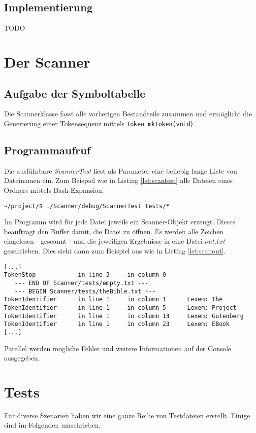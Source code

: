 \documentclass[
a4paper,   %
11pt,      %
oneside,   %
onecolumn, %
final      %
]{article}
\newcommand{\code}[1]{\lstinline$#1$}
\begin{document}
\subsection{Implementierung}
TODO


\section{Der Scanner}

\subsection{Aufgabe der Symboltabelle}
Die Scannerklasse fasst alle vorherigen Bestandteile zusammen und ermöglicht die Generierung einer Tokensequenz mittels \code{Token mkToken(void)}.


\subsection{Programmaufruf}
Die ausführbare \emph{ScannerTest} liest als Parameter eine beliebig lange Liste von Dateinamen ein. Zum Beispiel wie in Listing \ref{lst:scantest} alle Dateien eines Ordners mittels Bash-Expansion.
\begin{lstlisting}[language=PseudoCode, caption={Aufruf von ScannerTest}, label=lst:scantest]
~/project/$ ./Scanner/debug/ScannerTest tests/*
\end{lstlisting}
Im Programm wird für jede Datei jeweils ein Scanner-Objekt erzeugt. Dieses beauftragt den Buffer damit, die Datei zu öffnen. Es werden alle Zeichen eingelesen - gescannt - und die jeweiligen Ergebnisse in eine Datei $out.txt$ geschrieben. Dies sieht dann zum Beispiel aus wie in Listing \ref{lst:scanout}.
\begin{lstlisting}[language=PseudoCode, firstnumber=57, caption={Dateiausgabe von ScannerTest}, label=lst:scanout]
[...]
TokenStop            in line 3     in column 0
   --- END OF Scanner/tests/empty.txt ---
   --- BEGIN Scanner/tests/theBible.txt ---
TokenIdentifier	     in line 1     in column 1      Lexem: The
TokenIdentifier	     in line 1     in column 5      Lexem: Project
TokenIdentifier	     in line 1     in column 13     Lexem: Gutenberg
TokenIdentifier      in line 1     in column 23     Lexem: EBook
[...]
\end{lstlisting}
Parallel werden mögliche Fehler und weitere Informationen auf der Console ausgegeben.

\section{Tests}
Für diverse Szenarien haben wir eine ganze Reihe von Testdateien erstellt. Einige sind im Folgenden umschrieben.
\end{document}
